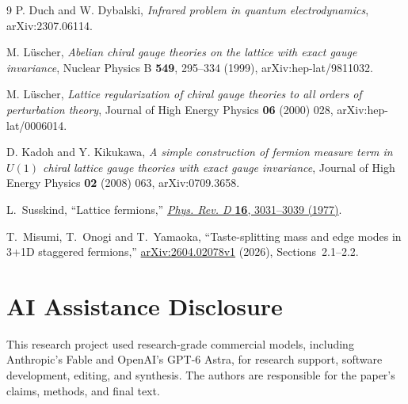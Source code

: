 \documentclass[11pt]{article}
\begin{document}
\begin{thebibliography}{9}
P. Duch and W. Dybalski,
\emph{Infrared problem in quantum electrodynamics},
arXiv:2307.06114.

M. L\"uscher,
\emph{Abelian chiral gauge theories on the lattice with exact gauge
invariance},
Nuclear Physics B \textbf{549}, 295--334 (1999), arXiv:hep-lat/9811032.

M. L\"uscher,
\emph{Lattice regularization of chiral gauge theories to all orders of
perturbation theory},
Journal of High Energy Physics \textbf{06} (2000) 028, arXiv:hep-lat/0006014.

D. Kadoh and Y. Kikukawa,
\emph{A simple construction of fermion measure term in \(U(1)\) chiral
lattice gauge theories with exact gauge invariance},
Journal of High Energy Physics \textbf{02} (2008) 063, arXiv:0709.3658.


L.~Susskind, ``Lattice fermions,''
\href{https://doi.org/10.1103/PhysRevD.16.3031}{\emph{Phys. Rev. D}
\textbf{16}, 3031--3039 (1977)}.

T.~Misumi, T.~Onogi and T.~Yamaoka,
``Taste-splitting mass and edge modes in 3+1D staggered fermions,''
\href{https://arxiv.org/abs/2604.02078v1}{arXiv:2604.02078v1} (2026),
Sections~2.1--2.2.

\end{thebibliography}

\section*{AI Assistance Disclosure}
This research project used research-grade commercial models, including
Anthropic's Fable and OpenAI's GPT-6 Astra, for research support, software
development, editing, and synthesis. The authors are responsible for the
paper's claims, methods, and final text.
\end{document}
